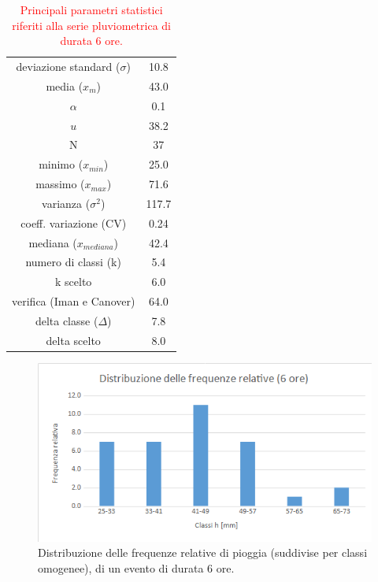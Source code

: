 \begin{table}[H] \centering
        \caption{\textcolor{red}{Principali parametri statistici riferiti alla serie pluviometrica di durata 6 ore.}}
     \begin{tabular}{cc}
        \toprule
    deviazione standard ($\sigma$) &  10.8\\
    media ($x_m$)              &  43.0\\
    $\alpha$            &  0.1 \\
    $u$           & 38.2\\
    N                &  37\\
    minimo ($x_{min}$)             & 25.0 \\
    massimo ($x_{max}$)            &  71.6\\
    varianza ($\sigma^2$)            &  117.7\\
    coeff. variazione (CV)    & 0.24 \\
    mediana ($x_{mediana}$)        &42.4  \\
    numero di classi (k)      &  5.4 \\
    k scelto                 &  6.0 \\
    verifica (Iman e Canover) &  64.0\\
    delta classe ($\Delta$)          & 7.8  \\
    delta scelto             & 8.0 \\
            \bottomrule
            \end{tabular}
    \end{table}

\begin{figure}[H]\centering
        \includegraphics[scale=.6]{immagini/freq_piogg_rel_6ore.png}
        \caption{Distribuzione delle frequenze relative di pioggia (suddivise per classi omogenee), di un evento di durata 6 ore.}
      \label{freq_rel_piogg_05ore}
\end{figure}
    
